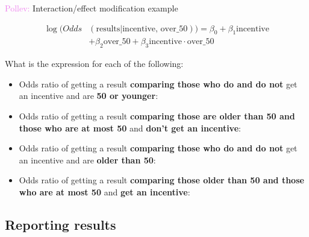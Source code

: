 \documentclass[10pt,t]{beamer}
\begin{document}
\begin{frame}{\textcolor{violet}{Pollev:} Interaction/effect modification example}
	
	\vspace{-5 mm}
	
	\color{blue}
	\begin{align*}
	\log(Odds&(\text{results}|\text{incentive, over\_50})) = \beta_0 + \beta_1\text{incentive}\\&+\beta_2\text{over\_50}+\beta_3\text{incentive}\cdot\text{over\_50}
	\end{align*}
	\color{black}
	
	\vspace{-2 mm}
	
	What is the expression for each of the following:
	
	\medskip
	
	\begin{itemize}
		\item Odds ratio of getting a result \textbf{comparing those who do and do not} get an incentive and are \textbf{50 or younger}: %
		
		\medskip
		
		\item Odds ratio of getting a result \textbf{comparing those are older than 50 and those who are at most 50} and \textbf{don't get an incentive}: %
		
		\medskip
		
		\item Odds ratio of getting a result \textbf{comparing those who do and do not} get an incentive and are \textbf{older than 50}: %
		
		\medskip
		
		\item Odds ratio of getting a result \textbf{comparing those older than 50 and those who are at most 50} and \textbf{get an incentive}: %
		
		
		
	\end{itemize}
	
\end{frame}

\subsection{Reporting results}
\end{document}

